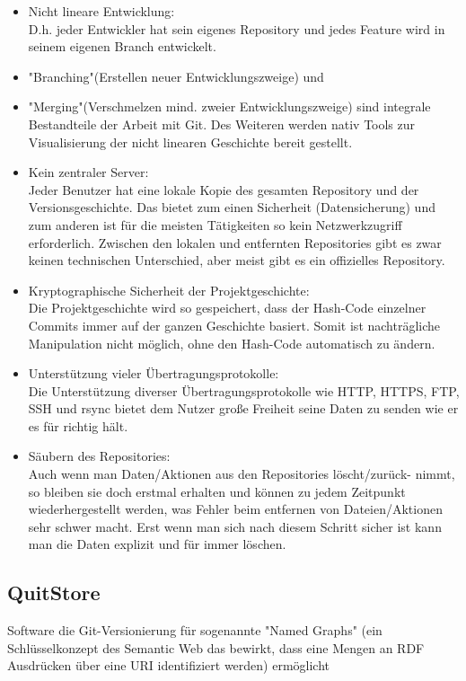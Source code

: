         \begin{itemize}
            \item Nicht lineare Entwicklung:\\
            D.h. jeder Entwickler hat sein eigenes Repository und jedes Feature
            wird in seinem eigenen Branch entwickelt.
            \item "Branching"(Erstellen neuer Entwicklungszweige) und
            \item "Merging"(Verschmelzen mind. zweier Entwicklungszweige) sind integrale Bestandteile der Arbeit mit Git. Des Weiteren werden nativ Tools zur Visualisierung der nicht linearen Geschichte bereit gestellt.
            \item Kein zentraler Server:\\
            Jeder Benutzer hat eine lokale Kopie des gesamten Repository und der Versionsgeschichte. Das bietet zum einen Sicherheit (Datensicherung) und zum anderen ist für die meisten Tätigkeiten so kein Netzwerkzugriff erforderlich. Zwischen den lokalen und entfernten Repositories gibt es zwar keinen technischen Unterschied, aber meist gibt es ein offizielles Repository.
            \item Kryptographische Sicherheit der Projektgeschichte:\\
            Die Projektgeschichte wird so gespeichert, dass der Hash-Code einzelner Commits immer auf der ganzen Geschichte basiert. Somit ist
            nachträgliche Manipulation nicht möglich, ohne den Hash-Code automatisch zu ändern.
            \item Unterstützung vieler Übertragungsprotokolle:\\
            Die Unterstützung diverser Übertragungsprotokolle wie HTTP, HTTPS, FTP, SSH und rsync bietet dem Nutzer große Freiheit seine Daten zu
            senden wie er es für richtig hält.
            \item Säubern des Repositories:\\
            Auch wenn man Daten/Aktionen aus den Repositories löscht/zurück-
            nimmt, so bleiben sie doch erstmal erhalten und können zu jedem Zeitpunkt wiederhergestellt werden, was Fehler beim entfernen von Dateien/Aktionen sehr schwer macht. Erst wenn man sich nach diesem Schritt sicher ist kann man die Daten explizit und für immer löschen.
        \end{itemize}
    
    \subsection{QuitStore}
    Software die Git-Versionierung für sogenannte "Named Graphs" (ein Schlüsselkonzept des Semantic Web das bewirkt, dass eine Mengen an RDF Ausdrücken über eine URI identifiziert werden) ermöglicht

